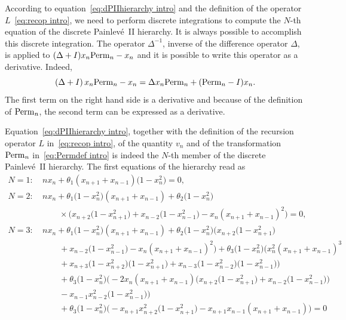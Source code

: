 \documentclass[pdftex]{sigma}%
\numberwithin{equation}{section}
\begin{document}
\begin{Remark}
According to equation~\eqref{eq:dPIIhierarchy intro} and the definition of the operator $L$~\eqref{eq:recop intro}, we need to perform discrete integrations to compute the $N$-th equation of the discrete Painlev\'e~II hierarchy. It is always possible to accomplish this discrete integration. The operator $\Delta^{-1}$, inverse of the difference operator $\Delta$, is applied to $(\Delta+I)x_{n}{\rm Perm}_n-x_n$ and it is possible to write this operator as a derivative. Indeed,
\begin{equation*}
\left(\Delta+I\right)x_{n}{\rm Perm}_n-x_n=\Delta x_n{\rm Perm}_n+({\rm Perm}_n-I)x_n.
\end{equation*}
The first term on the right hand side is a derivative and because of the definition of ${\rm Perm}_n$, the second term can be expressed as a derivative.
\end{Remark}
Equation~\eqref{eq:dPIIhierarchy intro}, together with the definition of the recursion operator $L$ in~\eqref{eq:recop intro}, of the quantity $v_n$ and of the transformation ${\rm Perm}_n$ in~\eqref{eq:Permdef intro} is indeed the $N$-th member of the discrete Painlev\'e~II hierarchy.
The first equations of the hierarchy read as
\begin{align}\label{eq:hierar1 intro}
N=1\colon\ &n x_n+\theta_1(x_{n+1}+x_{n-1})\big(1-x_n^2\big)=0,
\\
N=2\colon\
&n x_n+\theta_1\big(1-x_n^2\big)(x_{n+1}+x_{n-1})
+\theta_2\big(1-x_n^2\big)\nonumber
\\
&\qquad\times{}\bigl(x_{n+2}\big(1-x_{n+1}^2\big)+x_{n-2}\big(1-x_{n-1}^2\big)-x_n(x_{n+1}+x_{n-1})^2\bigr)=0,
\label{eq:hierar2 intro}
\\
N=3\colon\	&nx_n+\theta_1\big(1-x_n^2\big)(x_{n+1}+x_{n-1})
+\theta_2\big(1-x_n^2\big)\bigl(x_{n+2}\big(1-x_{n+1}^2\big)\nonumber
\\
&\qquad{}+x_{n-2}\big(1-x_{n-1}^2\big)-x_n(x_{n+1}+x_{n-1})^2\bigr)
+\theta_3\big(1-x_n^2\big)\bigl(x_n^2(x_{n+1}+x_{n-1})^3\nonumber
\\
&\qquad{}+x_{n+3}\big(1-x_{n+2}^2\big)\big(1-x_{n+1}^2\big)+x_{n-3}\big(1-x_{n-2}^2\big)
\big(1-x_{n-1}^2\big)\bigr)\nonumber
\\
&\qquad{}+\theta_3\big(1-x_n^2\big)\bigl(-2x_n(x_{n+1}+x_{n-1})\big(x_{n+2}\big(1-x_{n+1}^2\big)+x_{n-2}
\big(1-x_{n-1}^2\big)\big)\nonumber
\\
&\qquad{}-x_{n-1}x_{n-2}^2\big(1-x_{n-1}^2\big)\bigr)\nonumber
\\
&\qquad{}+\theta_3\big(1-x_n^2\big)\bigl(-x_{n+1}x_{n+2}^2\big(1-x_{n+1}^2\big)-x_{n+1}x_{n-1}(x_{n+1}+x_{n-1})\bigr)=0
\label{eq:hierar3 intro}
\end{align}
\end{document}
